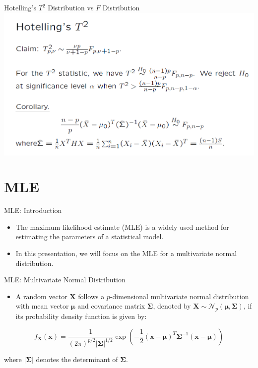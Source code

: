 \documentclass[
  ignorenonframetext,
]{beamer}
\providecommand{\tightlist}{%
  \setlength{\itemsep}{0pt}\setlength{\parskip}{0pt}}
\begin{document}
\begin{frame}{Hotelling's \(T^2\) Distribution vs \(F\) Distribution}
\protect\hypertarget{hotellings-t2-distribution-vs-f-distribution}{}
\includegraphics[width=0.8\linewidth]{img/T2vsF}
\end{frame}

\hypertarget{mle}{%
\section{MLE}\label{mle}}

\begin{frame}{MLE: Introduction}
\protect\hypertarget{mle-introduction}{}
\begin{itemize}
\item
  The maximum likelihood estimate (MLE) is a widely used method for
  estimating the parameters of a statistical model.
\item
  In this presentation, we will focus on the MLE for a multivariate
  normal distribution.
\end{itemize}
\end{frame}

\begin{frame}{MLE: Multivariate Normal Distribution}
\protect\hypertarget{mle-multivariate-normal-distribution}{}
\begin{itemize}
\tightlist
\item
  A random vector \(\boldsymbol{X}\) follows a \(p\)-dimensional
  multivariate normal distribution with mean vector \(\boldsymbol{\mu}\)
  and covariance matrix \(\boldsymbol{\Sigma}\), denoted by
  \(\boldsymbol{X} \sim \mathcal{N}_p(\boldsymbol{\mu}, \boldsymbol{\Sigma})\),
  if its probability density function is given by:
\end{itemize}

\[
f_{\boldsymbol{X}}(\boldsymbol{x}) = \frac{1}{(2\pi)^{p/2} |\boldsymbol{\Sigma}|^{1/2}} \exp\left(-\frac{1}{2} (\boldsymbol{x} - \boldsymbol{\mu})^T \boldsymbol{\Sigma}^{-1} (\boldsymbol{x} - \boldsymbol{\mu})\right)
\]

where \(|\boldsymbol{\Sigma}|\) denotes the determinant of
\(\boldsymbol{\Sigma}\).
\end{frame}
\end{document}
